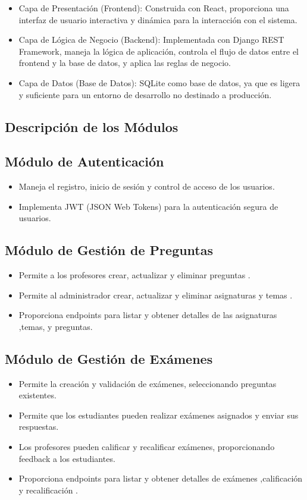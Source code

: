 \documentclass[a4paper,12pt]{article}
\begin{document}
\begin{itemize}
	\item Capa de Presentación (Frontend): Construida con React, proporciona una interfaz de usuario interactiva y dinámica para la interacción con el sistema.
	\item Capa de Lógica de Negocio (Backend): Implementada con Django REST Framework, maneja la lógica de aplicación, controla el flujo de datos entre el frontend y la base de datos, y aplica las reglas de negocio.
	\item Capa de Datos (Base de Datos): SQLite como base de datos, ya que es ligera y suficiente para un
	entorno de desarrollo no destinado a producción.
\end{itemize}

\subsection{Descripción de los Módulos}
\subsection{Módulo de Autenticación}
\begin{itemize}
	\item Maneja el registro, inicio de sesión y control de acceso de los usuarios.
	\item Implementa JWT (JSON Web Tokens) para la autenticación segura de usuarios.
	
\end{itemize}
\subsection{Módulo de Gestión de Preguntas}
\begin{itemize}
	\item Permite a los profesores crear, actualizar y eliminar preguntas .
	\item Permite al administrador crear, actualizar y eliminar asignaturas y temas .
	\item Proporciona endpoints para listar y obtener detalles de las asignaturas ,temas, y preguntas.
	
	
\end{itemize}

\subsection{Módulo de Gestión de Exámenes}
\begin{itemize}
	\item Permite la creación y validación de exámenes, seleccionando preguntas existentes.
	\item  Permite que los estudiantes pueden realizar exámenes asignados y enviar sus respuestas.
	\item Los profesores pueden calificar y recalificar exámenes, proporcionando feedback a los estudiantes.
	\item Proporciona endpoints para listar y obtener detalles de exámenes ,calificación y recalificación .
\end{itemize}
\end{document}
